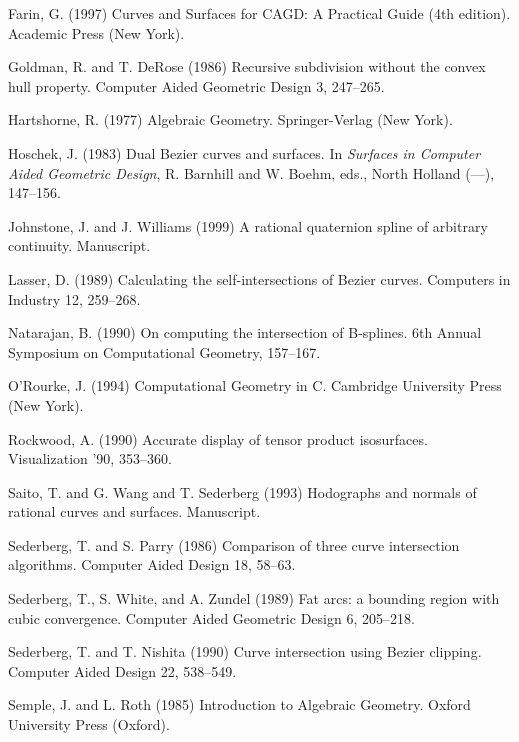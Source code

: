 \documentclass[11pt]{article}
\begin{document}

\begin{thebibliography}{Lozano-Perez 83}

Farin, G. (1997)
Curves and Surfaces for CAGD: A Practical Guide (4th edition).
Academic Press (New York).

Goldman, R. and T. DeRose (1986)
Recursive subdivision without the convex hull property.
Computer Aided Geometric Design 3, 247--265.

Hartshorne, R. (1977)
Algebraic Geometry.
Springer-Verlag (New York).

Hoschek, J. (1983)
Dual Bezier curves and surfaces.
In {\em Surfaces in Computer Aided Geometric Design},
R. Barnhill and W. Boehm, eds.,
North Holland (---), 147--156.

Johnstone, J. and J. Williams (1999)
A rational quaternion spline of arbitrary continuity.
Manuscript.

Lasser, D. (1989)
Calculating the self-intersections of Bezier curves.
Computers in Industry 12, 259--268.

Natarajan, B. (1990)
On computing the intersection of B-splines.
6th Annual Symposium on Computational Geometry, 157--167.

O'Rourke, J. (1994)
Computational Geometry in C.
Cambridge University Press (New York).

Rockwood, A. (1990)
Accurate display of tensor product isosurfaces.
Visualization '90, 353--360.

Saito, T. and G. Wang and T. Sederberg (1993)
Hodographs and normals of rational curves and surfaces.
Manuscript.

Sederberg, T. and S. Parry (1986)
Comparison of three curve intersection algorithms.
Computer Aided Design 18, 58--63.

Sederberg, T., S. White, and A. Zundel (1989)
Fat arcs: a bounding region with cubic convergence.
Computer Aided Geometric Design 6, 205--218.

Sederberg, T. and T. Nishita (1990)
Curve intersection using Bezier clipping.
Computer Aided Design 22, 538--549.

Semple, J. and L. Roth (1985)
Introduction to Algebraic Geometry.
Oxford University Press (Oxford).

\end{thebibliography}
\end{document}
